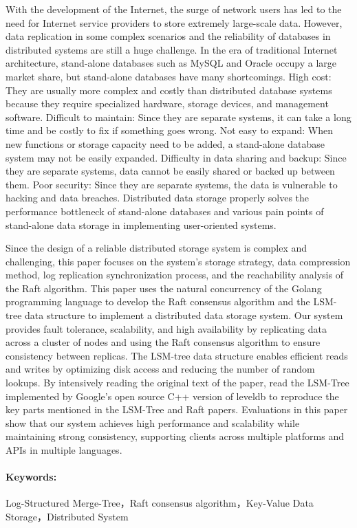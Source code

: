With the development of the Internet, the surge of network users has led to the need for Internet service providers to store extremely large-scale data. However, data replication in some complex scenarios and the reliability of databases in distributed systems are still a huge challenge.
In the era of traditional Internet architecture, stand-alone databases such as MySQL and Oracle occupy a large market share, but stand-alone databases have many shortcomings.
High cost: They are usually more complex and costly than distributed database systems because they require specialized hardware, storage devices, and management software.
Difficult to maintain: Since they are separate systems, it can take a long time and be costly to fix if something goes wrong.
Not easy to expand: When new functions or storage capacity need to be added, a stand-alone database system may not be easily expanded.
Difficulty in data sharing and backup: Since they are separate systems, data cannot be easily shared or backed up between them.
Poor security: Since they are separate systems, the data is vulnerable to hacking and data breaches.
Distributed data storage properly solves the performance bottleneck of stand-alone databases and various pain points of stand-alone data storage in implementing user-oriented systems.


Since the design of a reliable distributed storage system is complex and challenging, this paper focuses on the system's storage strategy, data compression method, log replication synchronization process, and the reachability analysis of the Raft algorithm.
This paper uses the natural concurrency of the Golang programming language to develop the Raft consensus algorithm and the LSM-tree data structure to implement a distributed data storage system.
Our system provides fault tolerance, scalability, and high availability by replicating data across a cluster of nodes and using the Raft consensus algorithm to ensure consistency between replicas.
The LSM-tree data structure enables efficient reads and writes by optimizing disk access and reducing the number of random lookups.
By intensively reading the original text of the paper, read the LSM-Tree implemented by Google's open source C++ version of leveldb to reproduce the key parts mentioned in the LSM-Tree and Raft papers.
Evaluations in this paper show that our system achieves high performance and scalability while maintaining strong consistency, supporting clients across multiple platforms and APIs in multiple languages.

\paragraph{Keywords: }Log-Structured Merge-Tree，Raft consensus algorithm，Key-Value Data Storage，Distributed System






